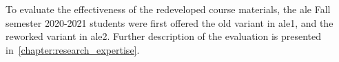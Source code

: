 To evaluate the effectiveness of the redeveloped course materials, the \acrshort{ale} Fall semester 2020-2021 students were first offered the old variant in \acrshort{ale}1, and the reworked variant in \acrshort{ale}2. Further description of the evaluation is presented in~\cref{chapter:research_expertise}. 